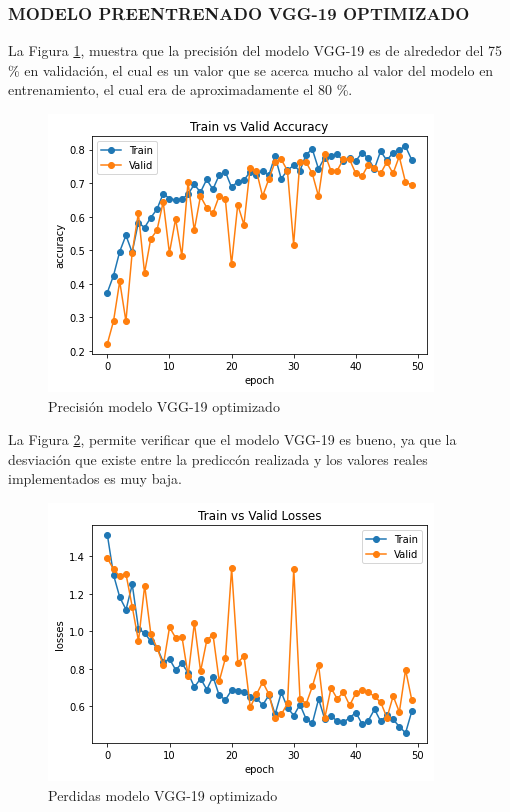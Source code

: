 	\subsubsection{\MakeUppercase{Modelo preentrenado VGG-19 optimizado}}
	La Figura \ref{fig:preci_vgg19_OPT}, muestra que la precisión del modelo VGG-19 es de alrededor del 75 \% en validación, el cual es un valor que se acerca mucho al valor del modelo en entrenamiento, el cual era de aproximadamente el 80 \%.
 		\begin{figure}[ht]
			\centering
			\includegraphics[scale=0.6]{Figs/504.png}
			\caption{Precisión modelo VGG-19 optimizado}
			\label{fig:preci_vgg19_OPT}
		\end{figure}
	
	La Figura \ref{fig:perdda_vgg19_opt}, permite verificar que el modelo VGG-19 es bueno, ya que la desviación que existe entre la prediccón realizada y los valores reales implementados es muy baja.
	
		\newpage
		\begin{figure}[ht]
			\centering
			\includegraphics[scale=0.6]{Figs/505.png}
			\caption{Perdidas modelo VGG-19 optimizado}
			\label{fig:perdda_vgg19_opt}
		\end{figure}
	
